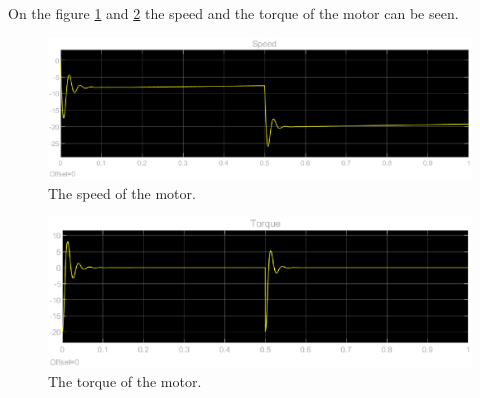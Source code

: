 On the figure \ref{fig:speed} and \ref{fig:torque} the speed and the torque of the motor can be seen.

\begin{figure}[H]
    \vspace{-0.4cm}
	\centering
	\includegraphics[width=0.9\linewidth]{pictures/control/speed.eps}
	\caption{The speed of the motor.}
	\label{fig:speed}
\end{figure}

\begin{figure}[H]
    \vspace{-0.7cm}
	\centering
	\includegraphics[width=0.9\linewidth]{pictures/control/torque.eps}
	\caption{The torque of the motor.}
	\label{fig:torque}
\end{figure}

